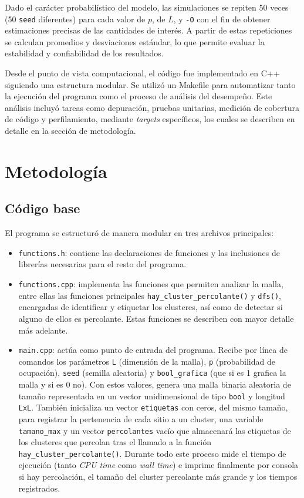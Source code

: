 \documentclass[%
 reprint,
 amsmath,amssymb,
 aps,
]{revtex4-2}
\begin{document}
Dado el carácter probabilístico del modelo, las simulaciones se repiten 50 veces (50 \texttt{seed} diferentes) para cada valor de $p$, de $L$, y \texttt{-O} con el fin de obtener estimaciones precisas de las cantidades de interés. A partir de estas repeticiones se calculan promedios y desviaciones estándar, lo que permite evaluar la estabilidad y confiabilidad de los resultados.

Desde el punto de vista computacional, el código fue implementado en C++ siguiendo una estructura modular. Se utilizó un Makefile para automatizar tanto la ejecución del programa como el proceso de análisis del desempeño. Este análisis incluyó tareas como depuración, pruebas unitarias, medición de cobertura de código y perfilamiento, mediante \textit{targets} específicos, los cuales se describen en detalle en la sección de metodología.

\section{Metodología}

\subsection{Código base}

El programa se estructuró de manera modular en tres archivos principales:

\begin{itemize}
    \item \texttt{functions.h}: contiene las declaraciones de funciones y las inclusiones de librerías necesarias para el resto del programa.
    
    \item \texttt{functions.cpp}: implementa las funciones que permiten analizar la malla, entre ellas las funciones principales \texttt{hay\_cluster\_percolante()} y \texttt{dfs()}, encargadas de identificar y etiquetar los clusteres, así como de detectar si alguno de ellos es percolante. Estas funciones se describen con mayor detalle más adelante.
    
    \item \texttt{main.cpp}: actúa como punto de entrada del programa. Recibe por línea de comandos los parámetros \texttt{L} (dimensión de la malla), \texttt{p} (probabilidad de ocupación), \texttt{seed} (semilla aleatoria) y \texttt{bool\_grafica} (que si es 1 grafica la malla y si es 0 no). Con estos valores, genera una malla binaria aleatoria de tamaño representada en un vector unidimensional de tipo \texttt{bool} y longitud \texttt{LxL}. También inicializa un vector \texttt{etiquetas} con ceros, del mismo tamaño, para registrar la pertenencia de cada sitio a un cluster, una variable \texttt{tamano\_max} y un vector \texttt{percolantes} vacío que almacenará las etiquetas de los clusteres que percolan tras el llamado a la función \texttt{hay\_cluster\_percolante()}. Durante todo este proceso mide el tiempo de ejecución (tanto \textit{CPU time} como \textit{wall time}) e imprime finalmente por consola si hay percolación, el tamaño del cluster percolante más grande y los tiempos registrados.
    
\end{itemize}
\end{document}

